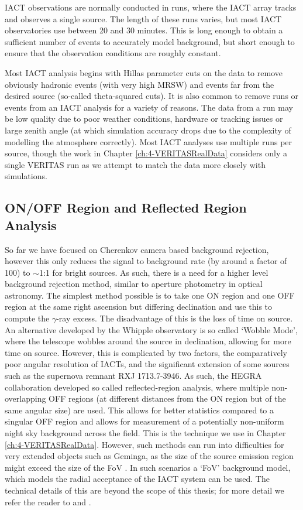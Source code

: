 IACT observations are normally conducted in runs, where the IACT array tracks and observes a single source. The length of these runs varies, but most IACT observatories use between 20 and 30 minutes. This is long enough to obtain a sufficient number of events to accurately model background, but short enough to ensure that the observation conditions are roughly constant.

Most IACT analysis begins with Hillas parameter cuts on the data to remove obviously hadronic events (with very high MRSW) and events far from the desired source (so-called theta-squared cuts). It is also common to remove runs or events from an IACT analysis for a variety of reasons. The data from a run may be low quality due to poor weather conditions, hardware or tracking issues or large zenith angle (at which simulation accuracy drops due to the complexity of modelling the atmosphere correctly). Most IACT analyses use multiple runs per source, though the work in Chapter \ref{ch:4-VERITASRealData} considers only a single VERITAS run as we attempt to match the data more closely with simulations.

\subsection{ON/OFF Region and Reflected Region Analysis}
So far we have focused on Cherenkov camera based background rejection, however this only reduces the signal to background rate (by around a factor of 100) to $\sim$1:1 for bright sources. As such, there is a need for a higher level background rejection method, similar to aperture photometry in optical astronomy. The simplest method possible is to take one ON region and one OFF region at the same right ascension but differing declination and use this to compute the $\gamma$-ray excess. The disadvantage of this is the loss of time on source. An alternative developed by the Whipple observatory is so called `Wobble Mode', where the telescope wobbles around the source in declination, allowing for more time on source. However, this is complicated by two factors, the comparatively poor angular resolution of IACTs, and the significant extension of some sources such as the supernova remnant RXJ 1713.7-3946. As such, the HEGRA collaboration \cite{HEGRA} developed so called reflected-region analysis, where multiple non-overlapping OFF regions (at different distances from the ON region but of the same angular size) are used. This allows for better statistics compared to a singular OFF region and allows for measurement of a potentially non-uniform night sky background across the field. This is the technique we use in Chapter \ref{ch:4-VERITASRealData}. However, such methods can run into difficulties for very extended objects such as Geminga, as the size of the source emission region might exceed the size of the FoV \cite{geminga}. In such scenarios a `FoV' background model, which models the radial acceptance of the IACT system can be used. The technical details of this are beyond the scope of this thesis; for more detail we refer the reader to \cite{Berge07} and \cite{geminga}. 

